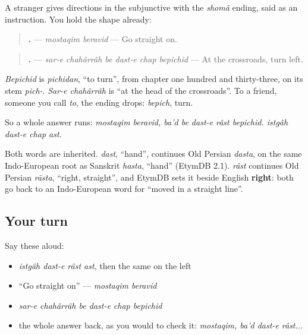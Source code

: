 \begin{grammarlens}[title={Grammar Lens: the polite instruction}]
A stranger gives directions in the subjunctive with the \emph{shomâ} ending, said as an instruction. You hold the shape already:

\begin{quote}
\textbf{ .} — \emph{mostaqim beravid} — Go straight on.
\end{quote}

\begin{quote}
\textbf{     .} — \emph{sar-e chahârrâh be dast-e chap bepichid} — At the crossroads, turn left.
\end{quote}

\emph{Bepichid} is \emph{pichidan}, \textquotedblleft{}to turn\textquotedblright{}, from chapter one hundred and thirty-three, on its stem \emph{pich-}. \emph{Sar-e chahârrâh} is \textquotedblleft{}at the head of the crossroads\textquotedblright{}. To a friend, someone you call \emph{to}, the ending drops: \emph{bepich}, turn.

So a whole answer runs: \emph{mostaqim beravid, ba'd be dast-e râst bepichid. istgâh dast-e chap ast.}
\end{grammarlens}

\begin{cousinweb}
Both words are inherited. \emph{dast}, \textquotedblleft{}hand\textquotedblright{}, continues Old Persian \emph{dasta}, on the same Indo-European root as Sanskrit \emph{hasta}, \textquotedblleft{}hand\textquotedblright{} (EtymDB 2.1). \emph{râst} continues Old Persian \emph{rāsta}, \textquotedblleft{}right, straight\textquotedblright{}, and EtymDB sets it beside English \textbf{right}: both go back to an Indo-European word for \textquotedblleft{}moved in a straight line\textquotedblright{}.
\end{cousinweb}

\subsection*{Your turn}
Say these aloud:

\begin{itemize}
\raggedright
  \item \emph{istgâh dast-e râst ast}, then the same on the left
  \item \textquotedblleft{}Go straight on\textquotedblright{} — \emph{mostaqim beravid}
  \item \emph{sar-e chahârrâh be dast-e chap bepichid}
  \item the whole answer back, as you would to check it: \emph{mostaqim, ba'd dast-e râst...}
\end{itemize}

